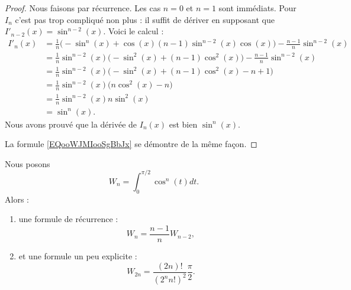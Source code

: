 \begin{proof}
	Nous faisons par récurrence. Les cas \( n=0\) et \( n=1\) sont immédiats. Pour \( I_n\) c'est pas trop compliqué non plus : il suffit de dériver en supposant que \( I'_{n-2}(x)=\sin^{n-2}(x)\). Voici le calcul :
	\begin{subequations}
		\begin{align}
			I'_n(x) & =\frac{1}{ n}\big( -\sin^n(x)+\cos(x)(n-1)\sin^{n-2}(x)\cos(x) \big)-\frac{ n-1 }{ n }\sin^{n-2}(x) \\
			        & =\frac{1}{ n}\sin^{n-2}(x)\big( -\sin^2(x)+(n-1)\cos^2(x) \big)-\frac{ n-1 }{ n }\sin^{n-2}(x)      \\
			        & =\frac{1}{ n}\sin^{n-2}(x)\big( -\sin^2(x)+(n-1)\cos^2(x)-n+1 \big)                                 \\
			        & =\frac{1}{ n}\sin^{n-2}(x)\big( n\cos^2(x)-n \big)                                                  \\
			        & =\frac{1}{ n}\sin^{n-2}(x)n\sin^2(x)                                                                \\
			        & =\sin^n(x).
		\end{align}
	\end{subequations}
	Nous avons prouvé que la dérivée de \( I_n(x)\) est bien \( \sin^n(x)\).

	La formule \eqref{EQooWJMIooSgBbJx} se démontre de la même façon.
\end{proof}

\begin{lemma}       \label{LEMooUOIBooLyMDft}
	Nous posons
	\begin{equation}
		W_n=\int_0^{\pi/2}\cos^n(t)dt.
	\end{equation}
	Alors :
	\begin{enumerate}
		\item
		      une formule de récurrence :
		      \begin{equation}        \label{EQooILMZooBUgJpk}
			      W_n=\frac{ n-1 }{ n }W_{n-2},
		      \end{equation}
		\item et une formule un peu explicite :
		      \begin{equation}        \label{EQooUYIDooEpHCnP}
			      W_{2n}=\frac{ (2n)! }{ (2^nn!)^2 }\frac{ \pi }{2}.
		      \end{equation}
	\end{enumerate}
\end{lemma}

